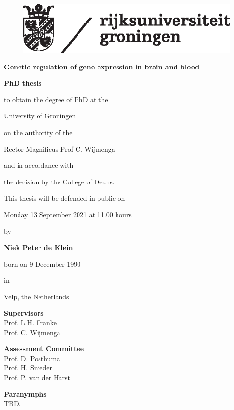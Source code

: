 
\begin{figure}[H]
	\includegraphics{img/rugr_logonl_zwart_cmyk.eps}
\end{figure}


\huge \textbf{Genetic regulation of gene expression in brain and blood}
\large
\vspace{2.5cm}
\\
\centerline{\textbf{ PhD thesis}}
\normalsize
\vspace{0.5cm}

\centerline{to obtain the degree of PhD at the}
\centerline{University of Groningen}
\centerline{on the authority of the}
\centerline{Rector Magnificus Prof C. Wijmenga}
\centerline{and in accordance with}
\centerline{the decision by the College of Deans.}
\vspace{0.2cm}
\centerline{This thesis will be defended in public on}
\vspace{0.2cm}
\centerline{Monday 13 September 2021 at 11.00 hours }
\vspace{0.5cm}
\centerline{by}
\vspace{0.5cm}
\centerline{\textbf{Niek Peter de Klein}}
\centerline{born on 9 December 1990}
\centerline{in}
\centerline{Velp, the Netherlands}

\newpage
\textbf{Supervisors} \\
Prof. L.H. Franke \\
Prof. C. Wijmenga

\textbf{Assessment Committee} \\
Prof. D. Posthuma \\
Prof. H. Snieder
\\
Prof. P. van der Harst

\newpage
\textbf{Paranymphs} \\
TBD.

\clearpage